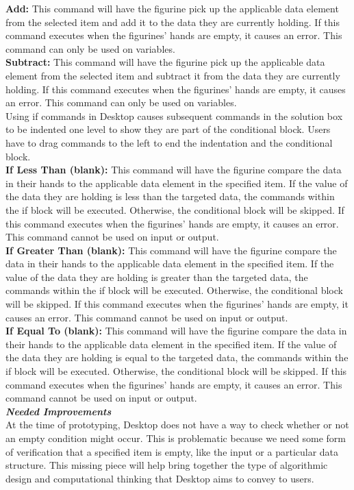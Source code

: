 \textbf{Add:}
This command will have the figurine pick up the applicable data element from the selected item and add it to the data they 
are currently holding. If this command executes when the figurines’ hands are empty, it causes an error. This command 
can only be used on variables.\\

\textbf{Subtract:}
This command will have the figurine pick up the applicable data element from the selected item and subtract it from the 
data they are currently holding. If this command executes when the figurines’ hands are empty, it causes an error. This 
command can only be used on variables.\\

Using if commands in Desktop causes subsequent commands in the solution box to be indented one level to show 
they are part of the conditional block. Users have to drag commands to the left to end the indentation and the conditional 
block.\\

\textbf{If Less Than (blank):}
This command will have the figurine compare the data in their hands to the applicable data element in the specified item. 
If the value of the data they are holding is less than the targeted data, the commands within the if block will be executed. 
Otherwise, the conditional block will be skipped. If this command executes when the figurines’ hands are empty, it causes 
an error. This command cannot be used on input or output.\\

\textbf{If Greater Than (blank):}
This command will have the figurine compare the data in their hands to the applicable data element in the specified item. If 
the value of the data they are holding is greater than the targeted data, the commands within the if block will be executed. 
Otherwise, the conditional block will be skipped. If this command executes when the figurines’ hands are empty, it causes 
an error. This command cannot be used on input or output.\\

\textbf{If Equal To (blank):}
This command will have the figurine compare the data in their hands to the applicable data element in the specified item. If 
the value of the data they are holding is equal to the targeted data, the commands within the if block will be executed. 
Otherwise, the conditional block will be skipped. If this command executes when the figurines’ hands are empty, it causes 
an error. This command cannot be used on input or output.\\

\textbf{\textit{Needed Improvements}}\\
At the time of prototyping, Desktop does not have a way to check whether or not an empty condition might occur. This 
is problematic because we need some form of verification that a specified item is empty, like the input or a particular data 
structure. This missing piece will help bring together the type of algorithmic design and computational thinking that Desktop 
aims to convey to users.\\